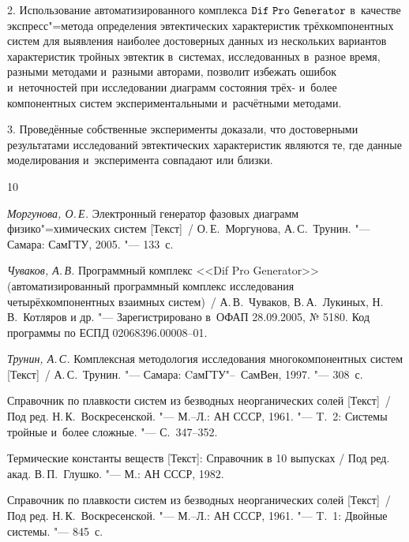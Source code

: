 2. Использование автоматизированного комплекса $\tt Dif\,\,Pro\,\,Generator$ в~качестве 
экспресс"=метода определения эвтектических характеристик трёхкомпонентных 
систем для выявления наиболее достоверных данных из нескольких вариантов 
характеристик тройных эвтектик в~системах, исследованных в~разное время, 
разными методами и~разными авторами, позволит избежать ошибок и~неточностей 
при исследовании диаграмм состояния трёх- и~более компонентных систем 
экспериментальными и~расчётными методами.

3. Проведённые собственные эксперименты доказали, что достоверными результатами 
исследований эвтектических характеристик являются те, где данные 
моделирования и~эксперимента совпадают или близки.



\begin{thebibliography}{10}

\item \textit{Моргунова, О.\,Е.} Электронный генератор фазовых диаграмм физико"=химических систем [Текст]~/ О.\,Е.~Моргунова, А.\,С.~Трунин.
"--- Самара: СамГТУ, 2005. "--- 133~с.


\item \textit{Чуваков, А.\,В.} 
Программный комплекс <<Dif Pro Generator>> (автоматизированный программный комплекс исследования четырёхкомпонентных взаимных систем)~/ 
А.\,В.~Чуваков, В.\,А.~Лукиных, Н.\,В.~Котляров и др. %
"--- Зарегистрировано в~ОФАП 28.09.2005, № 5180. Код программы по ЕСПД 02068396.00008--01. 


\item \textit{Трунин, А.\,С.} Комплексная методология исследования многокомпонентных систем [Текст]~/ А.\,С.~Трунин. "--- Самара: CамГТУ"--~СамВен, 1997. "--- 308~с.


\item Справочник по плавкости систем из безводных неорганических солей [Текст]~/  Под ред. Н.\,К.~Воскресенской. "--- М.--Л.: АН СССР, 1961. "--- T.~2: Системы тройные и~более сложные. "--- С.~347--352.

\item Термические константы веществ [Текст]: Справочник в 10 выпусках / Под ред. акад. В.\,П.~Глушко. "---  М.: АН СССР, 1982.

\item Справочник по плавкости систем из безводных неорганических солей [Текст]~/ Под ред. Н.\,К.~Воскресенской. "--- М.--Л.: АН СССР, 1961. "--- T.~1: Двойные системы. "--- 845~с.



\end{thebibliography}

